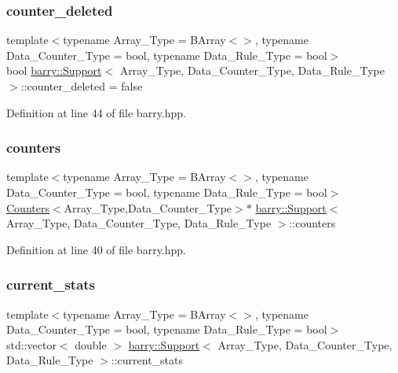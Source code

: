 \subsubsection{\texorpdfstring{counter\+\_\+deleted}{counter\_deleted}}
{\footnotesize\ttfamily template$<$typename Array\+\_\+\+Type  = B\+Array$<$$>$, typename Data\+\_\+\+Counter\+\_\+\+Type  = bool, typename Data\+\_\+\+Rule\+\_\+\+Type  = bool$>$ \\
bool \hyperlink{classbarry_1_1_support}{barry\+::\+Support}$<$ Array\+\_\+\+Type, Data\+\_\+\+Counter\+\_\+\+Type, Data\+\_\+\+Rule\+\_\+\+Type $>$\+::counter\+\_\+deleted = false}



Definition at line 44 of file barry.\+hpp.

\mbox{\label{classbarry_1_1_support_a4f02bd235d4c7eccfe167edbc7ebe596}} 
\subsubsection{\texorpdfstring{counters}{counters}}
{\footnotesize\ttfamily template$<$typename Array\+\_\+\+Type  = B\+Array$<$$>$, typename Data\+\_\+\+Counter\+\_\+\+Type  = bool, typename Data\+\_\+\+Rule\+\_\+\+Type  = bool$>$ \\
\hyperlink{classbarry_1_1_counters}{Counters}$<$Array\+\_\+\+Type,Data\+\_\+\+Counter\+\_\+\+Type$>$$\ast$ \hyperlink{classbarry_1_1_support}{barry\+::\+Support}$<$ Array\+\_\+\+Type, Data\+\_\+\+Counter\+\_\+\+Type, Data\+\_\+\+Rule\+\_\+\+Type $>$\+::counters}



Definition at line 40 of file barry.\+hpp.

\mbox{\label{classbarry_1_1_support_aa69d5a47e5ee039b19f42edacd5453d4}} 
\subsubsection{\texorpdfstring{current\+\_\+stats}{current\_stats}}
{\footnotesize\ttfamily template$<$typename Array\+\_\+\+Type  = B\+Array$<$$>$, typename Data\+\_\+\+Counter\+\_\+\+Type  = bool, typename Data\+\_\+\+Rule\+\_\+\+Type  = bool$>$ \\
std\+::vector$<$ double $>$ \hyperlink{classbarry_1_1_support}{barry\+::\+Support}$<$ Array\+\_\+\+Type, Data\+\_\+\+Counter\+\_\+\+Type, Data\+\_\+\+Rule\+\_\+\+Type $>$\+::current\+\_\+stats}



